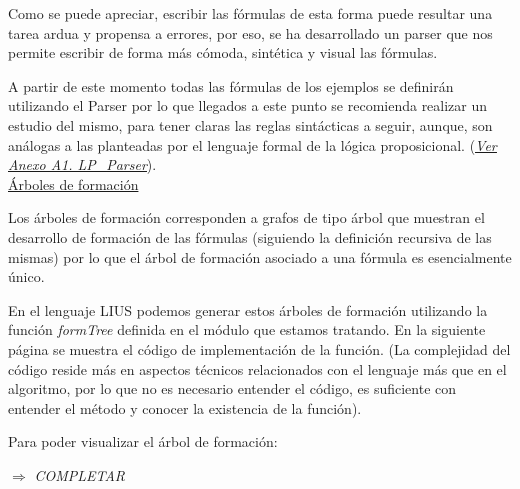 \documentclass[a4paper]{report}
\begin{document}
Como se puede apreciar, escribir las fórmulas de esta forma puede resultar una tarea ardua y propensa a errores, por eso, se ha desarrollado un parser que nos permite escribir de forma más cómoda, sintética y visual las fórmulas. 

A partir de este momento todas las fórmulas de los ejemplos se definirán utilizando el Parser por lo que llegados a este punto se recomienda realizar un estudio del mismo, para tener claras las reglas sintácticas a seguir, aunque, son análogas a las planteadas por el lenguaje formal de la lógica proposicional. (\hyperref[sec:A1.LPParser]{\textit{\underline{Ver Anexo A1. LP\_Parser}}}). \\ 

\noindent\underline{Árboles de formación}

Los árboles de formación corresponden a grafos de tipo árbol que muestran el desarrollo de formación de las fórmulas (siguiendo la definición recursiva de las mismas) por lo que el árbol de formación asociado a una fórmula es esencialmente único.

En el lenguaje LIUS podemos generar estos árboles de formación utilizando la función \textit{formTree} definida en el módulo que estamos tratando. En la siguiente página se muestra el código de implementación de la función. (La complejidad del código reside más en aspectos técnicos relacionados con el lenguaje más que en el algoritmo, por lo que no es necesario entender el código, es suficiente con entender el método y conocer la existencia de la función).

Para poder visualizar el árbol de formación: 

$\Longrightarrow$ \textit{COMPLETAR}

\newpage
\end{document}
